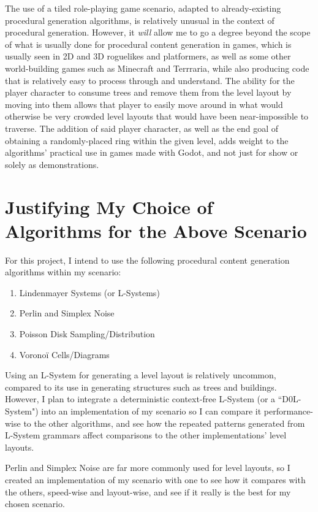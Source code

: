 The use of a tiled role-playing game scenario, adapted to already-existing procedural generation algorithms, is relatively unusual in the context of procedural generation. However, it \textit{will} allow me to go a degree beyond the scope of what is usually done for procedural content generation in games, which is usually seen in 2D and 3D roguelikes and platformers, as well as some other world-building games such as Minecraft and Terrraria, while also producing code that is relatively easy to process through and understand. The ability for the player character to consume trees and remove them from the level layout by moving into them allows that player to easily move around in what would otherwise be very crowded level layouts that would have been near-impossible to traverse. The addition of said player character, as well as the end goal of obtaining a randomly-placed ring within the given level, adds weight to the algorithms' practical use in games made with Godot, and not just for show or solely as demonstrations. 

\section{Justifying My Choice of Algorithms for the Above Scenario}

For this project, I intend to use the following procedural content generation algorithms within my scenario:

\begin{enumerate}
    \item Lindenmayer Systems (or L-Systems)
    \item Perlin and Simplex Noise
    \item Poisson Disk Sampling/Distribution
    \item Voronoï Cells/Diagrams
\end{enumerate}

Using an L-System for generating a level layout is relatively uncommon, compared to its use in generating structures such as trees and buildings. However, I plan to integrate a deterministic context-free L-System (or a ``D0L-System") into an implementation of my scenario so I can compare it performance-wise to the other algorithms, and see how the repeated patterns generated from L-System grammars affect comparisons to the other implementations' level layouts. 

Perlin and Simplex Noise are far more commonly used for level layouts, so I created an implementation of my scenario with one to see how it compares with the others, speed-wise and layout-wise, and see if it really is the best for my chosen scenario.

